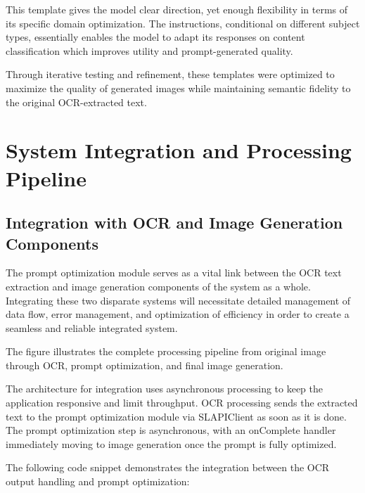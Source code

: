 This template gives the model clear direction, yet enough flexibility in terms of its specific domain optimization. The instructions, conditional on different subject types, essentially enables the model to adapt its responses on content classification which improves utility and prompt-generated quality.

Through iterative testing and refinement, these templates were optimized to maximize the quality of generated images while maintaining semantic fidelity to the original OCR-extracted text.


\section{System Integration and Processing Pipeline}

\subsection{Integration with OCR and Image Generation Components}

The prompt optimization module serves as a vital link between the OCR text extraction and image generation components of the system as a whole. Integrating these two disparate systems will necessitate detailed management of data flow, error management, and optimization of efficiency in order to create a seamless and reliable integrated system.

The figure illustrates the complete processing pipeline from original image through OCR, prompt optimization, and final image generation.



The architecture for integration uses asynchronous processing to keep the application responsive and limit throughput. OCR processing sends the extracted text to the prompt optimization module via SLAPIClient as soon as it is done. The prompt optimization step is asynchronous, with an onComplete handler immediately moving to image generation once the prompt is fully optimized.

The following code snippet demonstrates the integration between the OCR output handling and prompt optimization:


